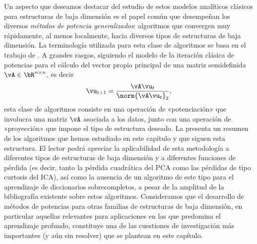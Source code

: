 \documentclass[../../book-main.tex]{subfiles}
\begin{document}
\begin{table}[tb]
    \centering
    \caption{Resumen de los métodos (generalizados) de las potencias presentados en este capítulo.}
    \label{tab:power-method-summary}
\end{table}

Un aspecto que deseamos destacar del estudio de estos modelos analíticos clásicos
para estructuras de baja dimensión es el papel común que desempeñan
los diversos \textit{métodos de potencia generalizados}: algoritmos que convergen muy rápidamente,
al menos localmente, hacia diversos tipos de estructuras de baja dimensión. La terminología
utilizada para esta clase de algoritmos se basa en el trabajo de \textcite{JourneeM2010}.
A grandes rasgos, siguiendo el modelo de la iteración clásica de potencias para
el cálculo del vector propio principal de una matriz semidefinida $\vA \in \bR^{n \times n}$, es decir
\begin{equation}
    \vu_{t+1} = \frac{\vA \vu_{t}}{\norm{\vA \vu_{t}}_2},
\end{equation}
esta clase de algoritmos consiste en una operación de «potenciación» que involucra una matriz
$\vA$ asociada a los datos, junto con una operación de «proyección» que
impone el tipo de estructura deseado. La  presenta
un resumen de los algoritmos que hemos estudiado en este capítulo y que siguen esta
estructura. El lector podrá apreciar la aplicabilidad de esta metodología a
diferentes tipos de estructuras de baja dimensión y a diferentes funciones de pérdida (es decir, tanto
la pérdida cuadrática del PCA como las pérdidas de tipo curtosis del ICA), así como
la ausencia de un algoritmo de este tipo para el aprendizaje de diccionarios sobrecompletos, a pesar de la
amplitud de la bibliografía existente sobre estos algoritmos. Consideramos que el desarrollo de métodos de 
potencias para otras familias de estructuras de baja dimensión, en particular aquellas
relevantes para aplicaciones en las que predomina el aprendizaje profundo, constituye 
una de las cuestiones de investigación más importantes (y aún sin resolver) que se 
plantean en este capítulo.
\end{document}
